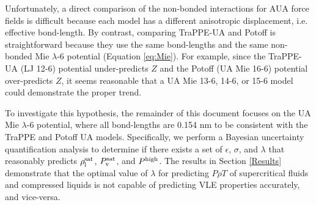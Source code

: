 \documentclass[preprint,letterpaper,floatfix,citeautoscript,aip,jcp]{revtex4-1}
\begin{document}
Unfortunately, a direct comparison of the non-bonded interactions for AUA force fields is difficult because each model has a different anisotropic displacement, i.e. effective bond-length. 
By contrast, 
comparing TraPPE-UA and Potoff is straightforward because they use the same bond-lengths and the same non-bonded Mie $\lambda$-6 potential (Equation \ref{eq:Mie}). For example, since the TraPPE-UA (LJ 12-6) potential under-predicts $Z$ and the Potoff (UA Mie 16-6) potential over-predicts $Z$, it seems reasonable that a UA Mie 13-6, 14-6, or 15-6 model 
could
demonstrate the proper trend. %

To investigate this hypothesis, the remainder of this document focuses on the UA Mie $\lambda$-6 potential, where all bond-lengths are 0.154 nm to be consistent with the TraPPE and Potoff UA models.
Specifically, we perform a Bayesian uncertainty quantification analysis to determine if there exists a set of $\epsilon$, $\sigma$, and $\lambda$ that reasonably predicts $\rho_{\rm l}^{\rm sat}$, $P_{\rm v}^{\rm sat}$, and $P^{\rm high}$. The results in Section \ref{Results} demonstrate that the optimal value of $\lambda$ for predicting $P \rho T$ of supercritical fluids and compressed liquids is not capable of predicting VLE properties accurately, and vice-versa. 


\end{document}
